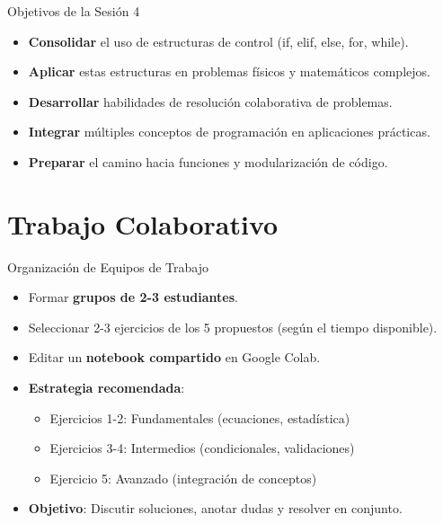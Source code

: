 \documentclass[10pt]{beamer}
\begin{document}
\begin{frame}{Objetivos de la Sesión 4}
  \begin{itemize}
    \item \textbf{Consolidar} el uso de estructuras de control (if, elif, else, for, while).
    \item \textbf{Aplicar} estas estructuras en problemas físicos y matemáticos complejos.
    \item \textbf{Desarrollar} habilidades de resolución colaborativa de problemas.
    \item \textbf{Integrar} múltiples conceptos de programación en aplicaciones prácticas.
    \item \textbf{Preparar} el camino hacia funciones y modularización de código.
  \end{itemize}
\end{frame}


\section{Trabajo Colaborativo}

\begin{frame}{Organización de Equipos de Trabajo}
  \begin{itemize}
    \item Formar \textbf{grupos de 2-3 estudiantes}.
    \item Seleccionar 2-3 ejercicios de los 5 propuestos (según el tiempo disponible).
    \item Editar un \textbf{notebook compartido} en Google Colab.
    \item \textbf{Estrategia recomendada}:
      \begin{itemize}
        \item Ejercicios 1-2: Fundamentales (ecuaciones, estadística)
        \item Ejercicios 3-4: Intermedios (condicionales, validaciones)
        \item Ejercicio 5: Avanzado (integración de conceptos)
      \end{itemize}
    \item \textbf{Objetivo}: Discutir soluciones, anotar dudas y resolver en conjunto.
  \end{itemize}
\end{frame}
\end{document}
